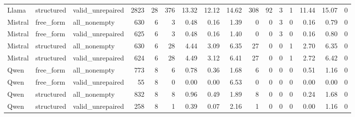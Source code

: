 \begin{tabular}{lllrrrrrrrrrrrrr}
Llama & structured & valid\_unrepaired & 2823 & 28 & 376 & 13.32 & 12.12 & 14.62 & 308 & 92 & 3 & 1 & 11.44 & 15.07 & 0 \\
Mistral & free\_form & all\_nonempty & 630 & 6 & 3 & 0.48 & 0.16 & 1.39 & 0 & 0 & 3 & 0 & 0.16 & 0.79 & 0 \\
Mistral & free\_form & valid\_unrepaired & 625 & 6 & 3 & 0.48 & 0.16 & 1.40 & 0 & 0 & 3 & 0 & 0.16 & 0.80 & 0 \\
Mistral & structured & all\_nonempty & 630 & 6 & 28 & 4.44 & 3.09 & 6.35 & 27 & 0 & 0 & 1 & 2.70 & 6.35 & 0 \\
Mistral & structured & valid\_unrepaired & 624 & 6 & 28 & 4.49 & 3.12 & 6.41 & 27 & 0 & 0 & 1 & 2.72 & 6.42 & 0 \\
Qwen & free\_form & all\_nonempty & 773 & 8 & 6 & 0.78 & 0.36 & 1.68 & 6 & 0 & 0 & 0 & 0.51 & 1.16 & 0 \\
Qwen & free\_form & valid\_unrepaired & 55 & 8 & 0 & 0.00 & 0.00 & 6.53 & 0 & 0 & 0 & 0 & 0.00 & 0.00 & 0 \\
Qwen & structured & all\_nonempty & 832 & 8 & 8 & 0.96 & 0.49 & 1.89 & 8 & 0 & 0 & 0 & 0.24 & 1.68 & 0 \\
Qwen & structured & valid\_unrepaired & 258 & 8 & 1 & 0.39 & 0.07 & 2.16 & 1 & 0 & 0 & 0 & 0.00 & 1.16 & 0 \\
\bottomrule
\end{tabular}

